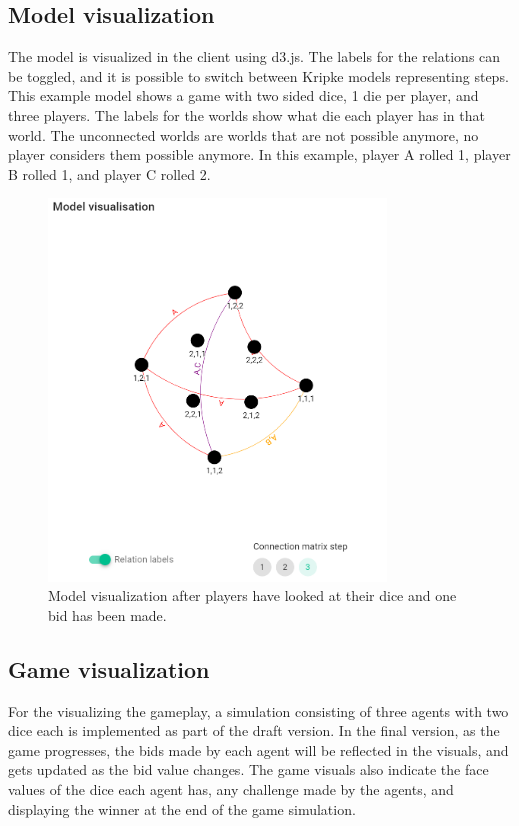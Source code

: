 \documentclass{article}
\begin{document}
\subsection*{Model visualization} %
The model is visualized in the client using d3.js. The labels for the relations can be toggled, and it is possible to switch between Kripke models representing steps. This example model shows a game with two sided dice, 1 die per player, and three players. The labels for the worlds show what die each player has in that world. The unconnected worlds are worlds that are not possible anymore, no player considers them possible anymore. In this example, player A rolled 1, player B rolled 1, and player C rolled 2.
\begin{figure}[ht]
    \includegraphics[width=0.8\textwidth]{img/screenshot.png}
    \centering
    \caption{Model visualization after players have looked at their dice and one bid has been made.}
    \label{fig:liarsdice}
\end{figure}

\subsection*{Game visualization}%
For the visualizing the gameplay, a simulation consisting of three agents with two dice each is implemented as part of the draft version. In the final version, as the game progresses, the bids made by each agent will be reflected in the visuals, and gets updated as the bid value changes. The game visuals also indicate the face values of the dice each agent has, any challenge made by the agents, and displaying the winner at the end of the game simulation. 
\end{document}
